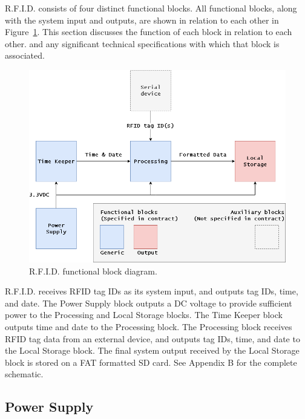 R.F.I.D. consists of four distinct functional blocks. All functional blocks, along with the system input and outputs, are shown in relation to each other in Figure~\ref{fig:functional_diagram}. This section discusses the function of each block in relation to each other. and any significant technical specifications with which that block is associated.

\begin{figure}[H]
    \centering
    \includegraphics[width=1\textwidth]{Figures/3_breakdown/FBD.png}
    \caption{R.F.I.D. functional block diagram.}
    \label{fig:functional_diagram}
\end{figure}



R.F.I.D. receives RFID tag IDs as its system input, and outputs tag IDs, time, and date. The Power Supply block outputs a DC voltage to provide sufficient power to the Processing and Local Storage blocks. The Time Keeper block outputs time and date to the Processing block. The Processing block receives RFID tag data from an external device, and outputs tag IDs, time, and date to the Local Storage block. The final system output received by the Local Storage block is stored on a FAT formatted SD card. See Appendix B for the complete schematic.


\subsection{Power Supply}

